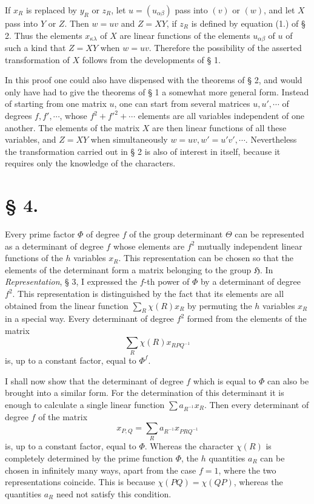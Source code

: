 \documentclass[11pt]{article}
\newcommand{\Hgr}{\mathfrak{H}}
\begin{document}
If $x_R$ is replaced by $y_R$ or $z_R$, let $u=(u_{\alpha\beta})$ pass into $(v)$ or $(w)$, and let $X$ pass into $Y$ or $Z$. Then $w=uv$ and $Z=XY$, if $z_R$ is defined by equation (1.) of § 2. Thus the elements $x_{\kappa\lambda}$ of $X$ are linear functions of the elements $u_{\alpha\beta}$ of $u$ of such a kind that $Z=XY$ when $w=uv$. Therefore the possibility of the asserted transformation of $X$ follows from the developments of § 1.

In this proof one could also have dispensed with the theorems of § 2, and would only have had to give the theorems of § 1 a somewhat more general form. Instead of starting from one matrix $u$, one can start from several matrices $u,u',\cdots$ of degrees $f,f',\cdots$, whose $f^2+f'^2+\cdots$ elements are all variables independent of one another. The elements of the matrix $X$ are then linear functions of all these variables, and $Z=XY$ when simultaneously $w=uv,w'=u'v',\cdots$. Nevertheless the transformation carried out in § 2 is also of interest in itself, because it requires only the knowledge of the characters.

\section*{§ 4.}

Every prime factor $\Phi$ of degree $f$ of the group determinant $\Theta$ can be represented as a determinant of degree $f$ whose elements are $f^2$ mutually independent linear functions of the $h$ variables $x_R$. This representation can be chosen so that the elements of the determinant form a matrix belonging to the group $\Hgr$. In \emph{Representation}, § 3, I expressed the $f$-th power of $\Phi$ by a determinant of degree $f^2$. This representation is distinguished by the fact that its elements are all obtained from the linear function $\sum_R\chi(R)x_R$ by permuting the $h$ variables $x_R$ in a special way. Every determinant of degree $f^2$ formed from the elements of the matrix
\begin{equation}\tag{1.}
\sum_R\chi(R)x_{RPQ^{-1}}
\end{equation}
is, up to a constant factor, equal to $\Phi^f$.

I shall now show that the determinant of degree $f$ which is equal to $\Phi$ can also be brought into a similar form. For the determination of this determinant it is enough to calculate a single linear function $\sum a_{R^{-1}}x_R$. Then every determinant of degree $f$ of the matrix
\begin{equation}\tag{2.}
x_{P,Q}=\sum_R a_{R^{-1}}x_{PRQ^{-1}}
\end{equation}
is, up to a constant factor, equal to $\Phi$. Whereas the character $\chi(R)$ is completely determined by the prime function $\Phi$, the $h$ quantities $a_R$ can be chosen in infinitely many ways, apart from the case $f=1$, where the two representations coincide. This is because $\chi(PQ)=\chi(QP)$, whereas the quantities $a_R$ need not satisfy this condition.
\end{document}
